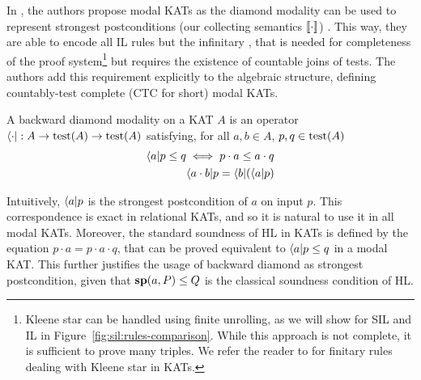 In \cite{MOH21}, the authors propose modal KATs as the diamond modality can be used to represent strongest postconditions (our collecting semantics $\llbracket\cdot\rrbracket$) \cite{DMS06}. This way, they are able to encode all IL rules but the infinitary , that is needed for completeness of the proof system\footnote{Kleene star can be handled using finite unrolling, as we will show for SIL and IL in Figure~\ref{fig:sil:rules-comparison}. While this approach is not complete, it is sufficient to prove many triples. We refer the reader to \cite[Figure~2]{MOH21} for finitary rules dealing with Kleene star in KATs.} but requires the existence of countable joins of tests. The authors add this requirement explicitly to the algebraic structure, defining countably-test complete (CTC for short) modal KATs.
\begin{definition}
	A backward diamond modality on a KAT $A$ is an operator $\langle \cdot \vert : A \rightarrow \text{test}(A) \rightarrow \text{test}(A)$ satisfying, for all $a, b \in A$, $p, q \in \text{test}(A)$
	\begin{align*}
		\langle a \vert p \le q \iff p \cdot a \le a \cdot q \\
		\langle a \cdot b \vert p = \langle b \vert (\langle a \vert p)
	\end{align*}
\end{definition}
Intuitively, $\langle a \vert p$ is the strongest postcondition of $a$ on input $p$. This correspondence is exact in relational KATs, and so it is natural to use it in all modal KATs. Moreover, the standard soundness of HL in KATs is defined by the equation $p \cdot a = p \cdot a \cdot q$, that can be proved equivalent to $\langle a \vert p \le q$ in a modal KAT. This further justifies the usage of backward diamond as strongest postcondition, given that $\textbf{sp}(a, P) \le Q$ is the classical soundness condition of HL.

